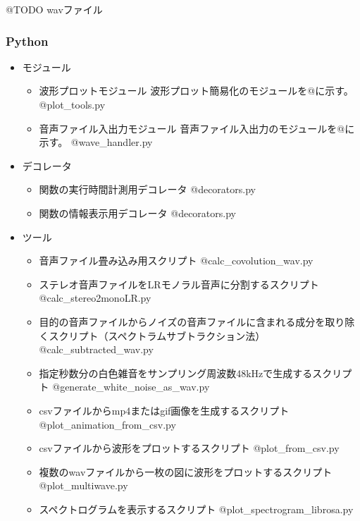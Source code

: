 @TODO wavファイル

\hypertarget{python}{%
\subsubsection{Python}\label{python}}

\begin{itemize}
\tightlist
\item
  モジュール

  \begin{itemize}
  \item
    波形プロットモジュール 波形プロット簡易化のモジュールを@に示す。
    @plot\_tools.py
  \item
    音声ファイル入出力モジュール
    音声ファイル入出力のモジュールを@に示す。 @wave\_handler.py
  \end{itemize}
\item
  デコレータ

  \begin{itemize}
  \item
    関数の実行時間計測用デコレータ @decorators.py
  \item
    関数の情報表示用デコレータ @decorators.py
  \end{itemize}
\item
  ツール

  \begin{itemize}
  \tightlist
  \item
    音声ファイル畳み込み用スクリプト @calc\_covolution\_wav.py
  \item
    ステレオ音声ファイルをLRモノラル音声に分割するスクリプト
    @calc\_stereo2monoLR.py
  \item
    目的の音声ファイルからノイズの音声ファイルに含まれる成分を取り除くスクリプト（スペクトラムサブトラクション法）
    @calc\_subtracted\_wav.py
  \item
    指定秒数分の白色雑音をサンプリング周波数48kHzで生成するスクリプト
    @generate\_white\_noise\_as\_wav.py
  \item
    csvファイルからmp4またはgif画像を生成するスクリプト
    @plot\_animation\_from\_csv.py
  \item
    csvファイルから波形をプロットするスクリプト @plot\_from\_csv.py
  \item
    複数のwavファイルから一枚の図に波形をプロットするスクリプト
    @plot\_multiwave.py
  \item
    スペクトログラムを表示するスクリプト @plot\_spectrogram\_librosa.py
  \end{itemize}
\end{itemize}

